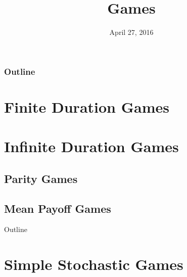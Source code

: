 \documentclass{beamer}
\title{Games}
\date{April 27, 2016}
\begin{document}
  \frame{\titlepage}

  \begin{frame}
    \frametitle{Outline}
    \tableofcontents
  \end{frame}

  \section{Finite Duration Games}
        
  \section{Infinite Duration Games}
      \subsection{Parity Games}
        
      \subsection{Mean Payoff Games}
      \begin{frame}{Outline}
            \tableofcontents[currentsection, currentsubsection, subsectionstyle=show/shaded/hide]
      \end{frame}
      
  \section{Simple Stochastic Games}
    
\end{document}
